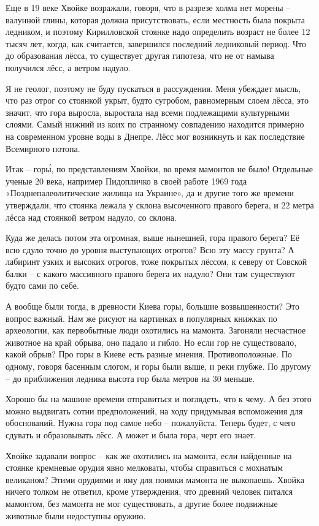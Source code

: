 Еще в 19 веке Хвойке возражали, говоря, что в разрезе холма нет морены – валунной глины, которая должна присутствовать, если местность была покрыта ледником, и поэтому Кирилловской стоянке надо определить возраст не более 12 тысяч лет, когда, как считается, завершился последний ледниковый период. Что до образования лёсса, то существует другая гипотеза, что не от намыва получился лёсс, а ветром надуло.

Я не геолог, поэтому не буду пускаться в рассуждения. Меня убеждает мысль, что раз отрог со стоянкой укрыт, будто сугробом, равномерным слоем лёсса, это значит, что гора выросла, выростала над всеми подлежащими культурными слоями. Самый нижний из коих по странному совпадению находится примерно на современном уровне воды в Днепре. Лёсс мог возникнуть и как последствие Всемирного потопа.

Итак – гор\'ы, по представлениям Хвойки, во время мамонтов не было! Отдельные ученые 20 века, например Пидопличко в своей работе 1969 года «Позднепалеолитические жилища на Украине», да и другие того же времени утверждали, что стоянка лежала у склона высоченного правого берега, и 22 метра лёсса над стоянкой ветром надуло, со склона.

Куда же делась потом эта огромная, выше нынешней, гора правого берега? Её всю сдуло точно до уровня выступающих отрогов? Всю эту массу грунта? А лабиринт узких и высоких отрогов, тоже покрытых лёссом, к северу от Совской балки – с какого массивного правого берега их надуло? Они там существуют будто сами по себе.

А вообще были тогда, в древности Киева горы, большие возвышенности? Это вопрос важный. Нам же рисуют на картинках в популярных книжках по археологии, как первобытные люди охотились на мамонта. Загоняли несчастное животное на край обрыва, оно падало и гибло. Но если гор не существовало, какой обрыв? Про горы в Киеве есть разные мнения. Противоположные. По одному, говоря басенным слогом, и горы были выше, и реки глубже. По другому – до приближения ледника высота гор была метров на 30 меньше.

Хорошо бы на машине времени отправиться и поглядеть, что к чему. А без этого можно выдвигать сотни предположений, на ходу придумывая вспоможения для обоснований. Нужна гора под самое небо – пожалуйста. Теперь будет, с чего сдувать и образовывать лёсс. А может и была гора, черт его знает.

Хвойке задавали вопрос – как же охотились на мамонта, если найденные на стоянке кремневые орудия явно мелковаты, чтобы справиться с мохнатым великаном? Этими орудиями и яму для поимки мамонта не выкопаешь. Хвойка ничего толком не ответил, кроме утверждения, что древний человек питался мамонтом, без мамонта не мог существовать, а другие более подвижные животные были недоступны оружию.

